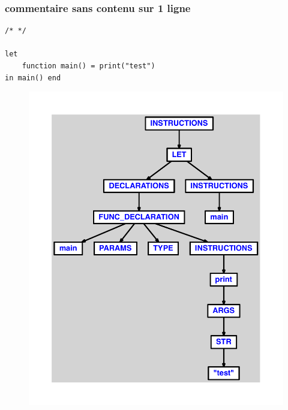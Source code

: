 \documentclass{article}
\begin{document}
\subsubsection{commentaire sans contenu sur 1 ligne}
\begin{lstlisting}
/* */

let
	function main() = print("test")
in main() end
\end{lstlisting}
\newpage
\begin{figure}[H]
\centering
\includegraphics[max width=\textwidth]{ast/ast_162.pdf}
\end{figure}
\newpage
\end{document}
